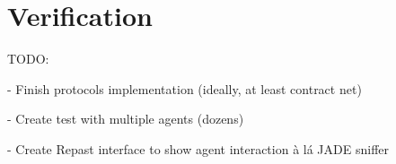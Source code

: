 \section{Verification}
\label{sec:verification}

TODO:

  - Finish protocols implementation (ideally, at least contract net)

  - Create test with multiple agents (dozens)

  - Create Repast interface to show agent interaction à lá JADE sniffer
